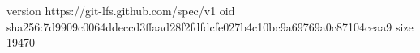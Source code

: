 version https://git-lfs.github.com/spec/v1
oid sha256:7d9909c0064ddeccd3ffaad28f2fdfdcfe027b4c10bc9a69769a0c87104ceaa9
size 19470
